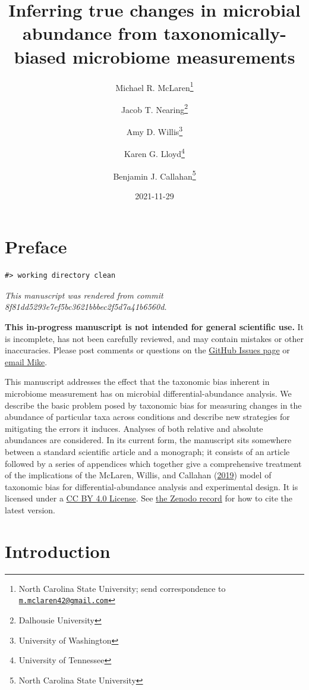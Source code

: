 \documentclass[
]{article}
\title{Inferring true changes in microbial abundance from taxonomically-biased microbiome measurements}
\author{Michael R. McLaren\footnote{North Carolina State University; send correspondence to \href{mailto:m.mclaren42@gmail.com}{\nolinkurl{m.mclaren42@gmail.com}}} \and Jacob T. Nearing\footnote{Dalhousie University} \and Amy D. Willis\footnote{University of Washington} \and Karen G. Lloyd\footnote{University of Tennessee} \and Benjamin J. Callahan\footnote{North Carolina State University}}
\date{2021-11-29}
\begin{document}
\maketitle

{
\setcounter{tocdepth}{2}
\tableofcontents
}
\hypertarget{preface}{%
\section*{Preface}\label{preface}}

\begin{verbatim}
#> working directory clean
\end{verbatim}

\emph{This manuscript was rendered from commit 8f81dd5293e7ef5bc3621bbbec2f5d7a41b6560d.}

\leavevmode{}%
\textbf{This in-progress manuscript is not intended for general scientific use.}
It is incomplete, has not been carefully reviewed, and may contain mistakes or other inaccuracies.
Please post comments or questions on the \href{https://github.com/mikemc/differential-abundance-theory/issues}{GitHub Issues page} or \href{m.mclaren42@gmail.com}{email Mike}.

This manuscript addresses the effect that the taxonomic bias inherent in microbiome measurement has on microbial differential-abundance analysis.
We describe the basic problem posed by taxonomic bias for measuring changes in the abundance of particular taxa across conditions and describe new strategies for mitigating the errors it induces.
Analyses of both relative and absolute abundances are considered.
In its current form, the manuscript sits somewhere between a standard scientific article and a monograph;
it consists of an article followed by a series of appendices which together give a comprehensive treatment of the implications of the McLaren, Willis, and Callahan (\protect\hyperlink{ref-mclaren2019cons}{2019}) model of taxonomic bias for differential-abundance analysis and experimental design.
It is licensed under a \href{https://creativecommons.org/licenses/by/4.0/}{CC BY 4.0 License}.
See \href{https://doi.org/10.5281/zenodo.4552717}{the Zenodo record} for how to cite the latest version.

\hypertarget{introduction}{%
\section{Introduction}\label{introduction}}
\end{document}
